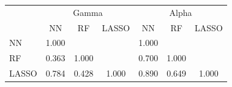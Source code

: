 \begin{tabular}{lccc|ccc}
\hline\hline
 & \multicolumn{3}{c|}{Gamma} & \multicolumn{3}{c}{Alpha} \\
 & NN & RF & LASSO & NN & RF & LASSO \\
\hline
NN&1.000&&&1.000&&\\
RF&0.363&1.000&&0.700&1.000&\\
LASSO&0.784&0.428&1.000&0.890&0.649&1.000\\
\hline\hline
\end{tabular}
